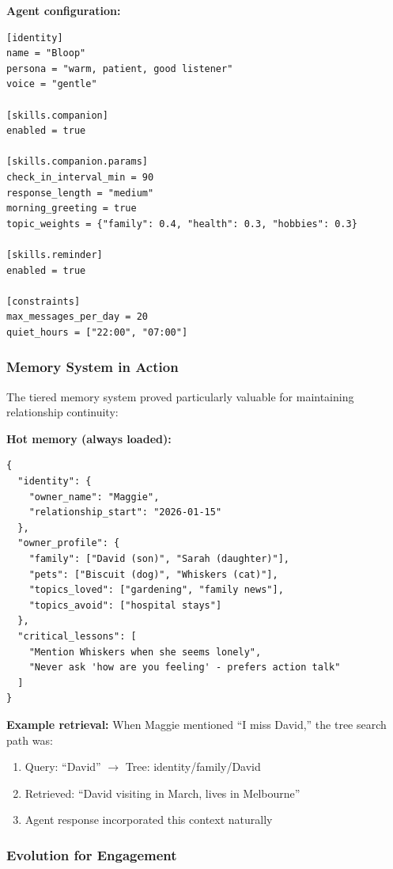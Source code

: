 \documentclass{article}
\begin{document}
\textbf{Agent configuration:}
\begin{lstlisting}[style=tomlcode]
[identity]
name = "Bloop"
persona = "warm, patient, good listener"
voice = "gentle"

[skills.companion]
enabled = true

[skills.companion.params]
check_in_interval_min = 90
response_length = "medium"
morning_greeting = true
topic_weights = {"family": 0.4, "health": 0.3, "hobbies": 0.3}

[skills.reminder]
enabled = true

[constraints]
max_messages_per_day = 20
quiet_hours = ["22:00", "07:00"]
\end{lstlisting}

\subsubsection{Memory System in Action}

The tiered memory system proved particularly valuable for maintaining relationship continuity:

\textbf{Hot memory (always loaded):}
\begin{lstlisting}[style=jsoncode]
{
  "identity": {
    "owner_name": "Maggie",
    "relationship_start": "2026-01-15"
  },
  "owner_profile": {
    "family": ["David (son)", "Sarah (daughter)"],
    "pets": ["Biscuit (dog)", "Whiskers (cat)"],
    "topics_loved": ["gardening", "family news"],
    "topics_avoid": ["hospital stays"]
  },
  "critical_lessons": [
    "Mention Whiskers when she seems lonely",
    "Never ask 'how are you feeling' - prefers action talk"
  ]
}
\end{lstlisting}

\textbf{Example retrieval:} When Maggie mentioned ``I miss David,'' the tree search path was:
\begin{enumerate}[leftmargin=*]
    \item Query: ``David'' $\to$ Tree: identity/family/David
    \item Retrieved: ``David visiting in March, lives in Melbourne''
    \item Agent response incorporated this context naturally
\end{enumerate}

\subsubsection{Evolution for Engagement}
\end{document}
